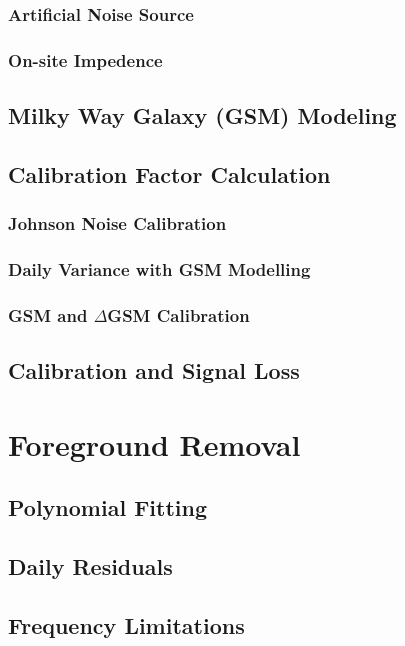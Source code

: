 \subsubsection{Artificial Noise Source}

\subsubsection{On-site Impedence}

\subsection{Milky Way Galaxy (GSM) Modeling}

\subsection{Calibration Factor Calculation}

\subsubsection{Johnson Noise Calibration}

\subsubsection{Daily Variance with GSM Modelling}

\subsubsection{GSM and $\Delta$GSM Calibration}

\subsection{Calibration and Signal Loss}

\section{Foreground Removal}

\subsection{Polynomial Fitting}

\subsection{Daily Residuals}

\subsection{Frequency Limitations}

